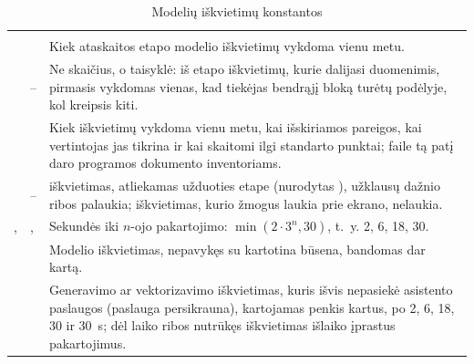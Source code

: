 \begin{xltabular}{\textwidth}{@{}L{44mm}L{19mm}Y@{}}
\caption{Modelių iškvietimų konstantos}\label{tab:config:calls}\\
\toprule
{} &  &  \\
\midrule
\endfirsthead
\toprule
{} &  &  \\
\midrule
\endhead
\bottomrule
\endlastfoot
{} &  & Kiek ataskaitos etapo modelio iškvietimų vykdoma vienu metu. \\
 & -- & Ne skaičius, o taisyklė: iš etapo iškvietimų, kurie dalijasi duomenimis, pirmasis vykdomas vienas, kad tiekėjas bendrąjį bloką turėtų podėlyje, kol kreipsis kiti. \\
 &  & Kiek iškvietimų vykdoma vienu metu, kai išskiriamos pareigos, kai vertintojas jas tikrina ir kai skaitomi ilgi standarto punktai;  faile  tą patį daro programos dokumento inventoriams. \\
 & -- &  iškvietimas, atliekamas užduoties etape (nurodytas ), užklausų dažnio ribos palaukia; iškvietimas, kurio žmogus laukia prie ekrano, nelaukia. \\
,  & ,  & Sekundės iki $n$-ojo pakartojimo: $\min(2\cdot 3^n, 30)$, t.~y. 2, 6, 18, 30. \\
 &  & Modelio iškvietimas, nepavykęs su kartotina būsena, bandomas dar kartą. \\
 &  & Generavimo ar vektorizavimo iškvietimas, kuris išvis nepasiekė asistento paslaugos (paslauga persikrauna), kartojamas penkis kartus, po 2, 6, 18, 30 ir 30~s; dėl laiko ribos nutrūkęs iškvietimas išlaiko įprastus pakartojimus. \\

\end{xltabular}
